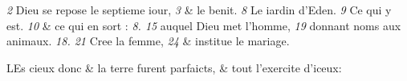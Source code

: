 \bchapter
{}
\pagestyle{scrplain}

\begin{chaptercomment}
 \emph{2} Dieu se repose le septieme iour,
 \emph{3} \& le benit.
 \emph{8} Le iardin d'Eden. \lb
 \emph{9} Ce qui y est.
 \emph{10} \& ce qui en sort :
 \emph{8. 15} auquel Dieu \lb
 met l'homme,
 \emph{19} donnant noms aux animaux.
 \emph{18. 21} Cree la \lb
 femme,
 \emph{24} \& institue le mariage.
\end{chaptercomment}

\vspace{\baselineskip}

\bversenonum \lettrine[lines=3,loversize=-0.2,lraise=0.2]{L}{}Es cieux donc \& la terre furent
parfaicts, \& tout l'exercite d'i\-ceux:

